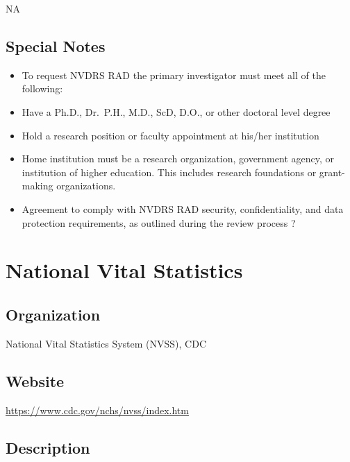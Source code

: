 \documentclass[
]{book}
\providecommand{\tightlist}{%
  \setlength{\itemsep}{0pt}\setlength{\parskip}{0pt}}
\begin{document}
NA

\hypertarget{special-notes-65}{%
\section{Special Notes}\label{special-notes-65}}

\begin{itemize}
\tightlist
\item
  To request NVDRS RAD the primary investigator must meet all of the following:
\item
  Have a Ph.D., Dr.~P.H., M.D., ScD, D.O., or other doctoral level degree
\item
  Hold a research position or faculty appointment at his/her institution
\item
  Home institution must be a research organization, government agency, or institution of higher education. This includes research foundations or grant-making organizations.
\item
  Agreement to comply with NVDRS RAD security, confidentiality, and data protection requirements, as outlined during the review process ?
\end{itemize}

\mainmatter

\hypertarget{national-vital-statistics}{%
\chapter{National Vital Statistics}\label{national-vital-statistics}}

\hypertarget{organization-66}{%
\section{Organization}\label{organization-66}}

National Vital Statistics System (NVSS), CDC

\hypertarget{website-66}{%
\section{Website}\label{website-66}}

\url{https://www.cdc.gov/nchs/nvss/index.htm}

\hypertarget{description-66}{%
\section{Description}\label{description-66}}
\end{document}

